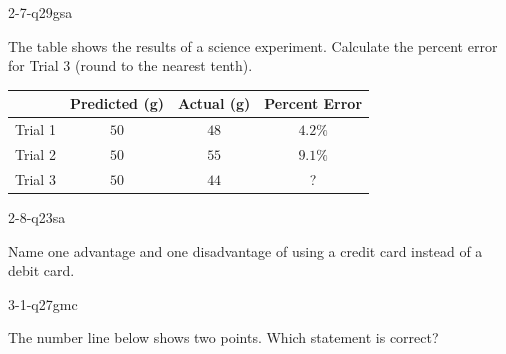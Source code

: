 \begin{practiceQuestion}{2-7-q29}{gsa}
\begin{questionText}
The table shows the results of a science experiment. Calculate the percent error for Trial 3 (round to the nearest tenth).

\begin{center}
\begin{tabular}{|l|c|c|c|}
\hline
 & \textbf{Predicted (g)} & \textbf{Actual (g)} & \textbf{Percent Error} \\
\hline
Trial 1 & $50$ & $48$ & $4.2\%$ \\
\hline
Trial 2 & $50$ & $55$ & $9.1\%$ \\
\hline
Trial 3 & $50$ & $44$ & ? \\
\hline
\end{tabular}
\end{center}
\end{questionText}
\end{practiceQuestion}

\begin{practiceQuestion}{2-8-q23}{sa}
\begin{questionText}
Name one advantage and one disadvantage of using a credit card instead of a debit card.
\end{questionText}
\end{practiceQuestion}

\begin{practiceQuestion}{3-1-q27}{gmc}
\begin{questionText}
The number line below shows two points. Which statement is correct?

\begin{center}
\end{center}
\end{questionText}
\end{practiceQuestion}

